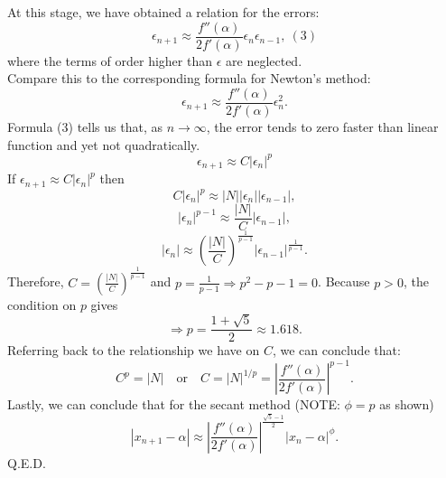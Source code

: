 \documentclass[12pt]{article}
\begin{document}
At this stage, we have obtained a relation for the errors:
\[
    \epsilon_{n+1} \approx \frac{f''(\alpha)}{2 f'(\alpha)} \epsilon_n \epsilon_{n-1}, \ (3)
\]
where the terms of order higher than \( \epsilon \) are neglected.
\\
Compare this to the corresponding formula for Newton's method:
\[
\epsilon_{n+1} \approx \frac{f''(\alpha)}{2 f'(\alpha)} \epsilon_n^2.
\]
Formula (3) tells us that, as \( n \to \infty \), the error tends to zero faster than linear function and yet not quadratically.
\[
    \epsilon_{n+1} \approx C |\epsilon_n|^p
\]
If \( \epsilon_{n+1} \approx C |\epsilon_n|^p \) then
\[
    C |\epsilon_n|^p \approx \left| N \right| |\epsilon_n| |\epsilon_{n-1}|,
\]
\[
    |\epsilon_n|^{p-1} \approx \frac{|N|}{C} |\epsilon_{n-1}|,
\]
\[
    |\epsilon_{n}| \approx \left( \frac{|N|}{C} \right)^{\frac{1}{p-1}} |\epsilon_{n-1}|^{\frac{1}{p-1}}.
\]
Therefore, \( C = \left( \frac{|N|}{C} \right)^{\frac{1}{p-1}} \) and \( p = \frac{1}{p-1} \Rightarrow p^2 - p - 1 = 0 \). Because \( p > 0 \), the condition on \( p \) gives
\[
    \Rightarrow p = \frac{1 + \sqrt{5}}{2} \approx 1.618.
\]
Referring back to the relationship we have on \( C \), we can conclude that:
\[
C^p = |N| \quad \text{or} \quad C = |N|^{1/p} = \left| \frac{f''(\alpha)}{2 f'(\alpha)} \right|^{p-1}.
\]
Lastly, we can conclude that for the secant method (NOTE: $\phi = p$ as shown)
\[
    |x_{n+1} - \alpha| \approx \left| \frac{f''(\alpha)}{2 f'(\alpha)} \right|^{\frac{\sqrt{5}-1}{2}} |x_n - \alpha|^{\phi}.
\]
Q.E.D.
\end{document}

